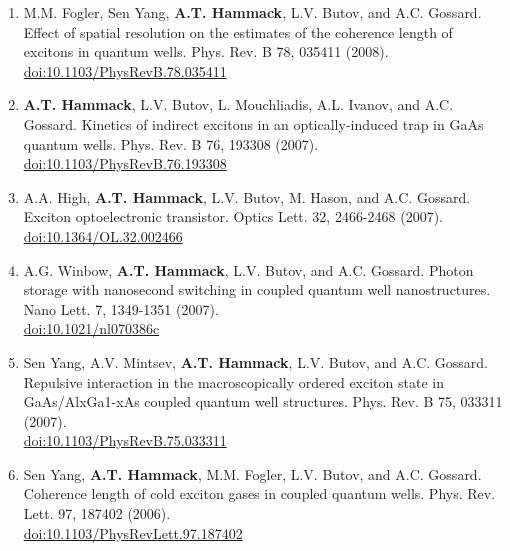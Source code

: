 {\begin{enumerate}[resume]
{        Phys. Rev. Lett. 102, 186803 (2009).
        \\ \href{https://doi.org/10.1103/PhysRevLett.102.186803}{dio:10.1103/PhysRevLett.102.186803}
        }
        \item {
        M.M. Fogler, Sen Yang, \textbf{A.T. Hammack}, L.V. Butov, and A.C. Gossard.
        Effect of spatial resolution on the estimates of the coherence length of excitons in quantum wells.
        Phys. Rev. B 78, 035411 (2008).
        \\ \href{https://doi.org/10.1103/PhysRevB.78.035411}{doi:10.1103/PhysRevB.78.035411}
        }
        \item {
        \textbf{A.T. Hammack}, L.V. Butov, L. Mouchliadis, A.L. Ivanov, and A.C. Gossard.
        Kinetics of indirect excitons in an optically-induced trap in GaAs quantum wells.
        Phys. Rev. B 76, 193308 (2007).
        \\ \href{https://doi.org/10.1103/PhysRevB.76.193308}{doi:10.1103/PhysRevB.76.193308}
        }
        \item {
        A.A. High, \textbf{A.T. Hammack}, L.V. Butov, M. Hason, and A.C. Gossard.
        Exciton optoelectronic transistor.
        Optics Lett. 32, 2466-2468 (2007).
        \\ \href{https://doi.org/10.1364/OL.32.002466}{doi:10.1364/OL.32.002466}
        }
        \item {
        A.G. Winbow, \textbf{A.T. Hammack}, L.V. Butov, and A.C. Gossard.
        Photon storage with nanosecond switching in coupled quantum well nanostructures.
        Nano Lett. 7, 1349-1351 (2007).
        \\ \href{https://doi.org/10.1021/nl070386c}{doi:10.1021/nl070386c}
        }
        \item {
        Sen Yang, A.V. Mintsev, \textbf{A.T. Hammack}, L.V. Butov, and A.C. Gossard.
        Repulsive interaction in the macroscopically ordered exciton state in GaAs/AlxGa1-xAs coupled quantum well structures.
        Phys. Rev. B 75, 033311 (2007).
        \\ \href{https://doi.org/10.1103/PhysRevB.75.033311}{doi:10.1103/PhysRevB.75.033311}
        }
        \item {
        Sen Yang, \textbf{A.T. Hammack}, M.M. Fogler, L.V. Butov, and A.C. Gossard.
        Coherence length of cold exciton gases in coupled quantum wells.
        Phys. Rev. Lett. 97, 187402 (2006).
        \\ \href{https://doi.org/10.1103/PhysRevLett.97.187402}{doi:10.1103/PhysRevLett.97.187402}
}
\end{enumerate}}

